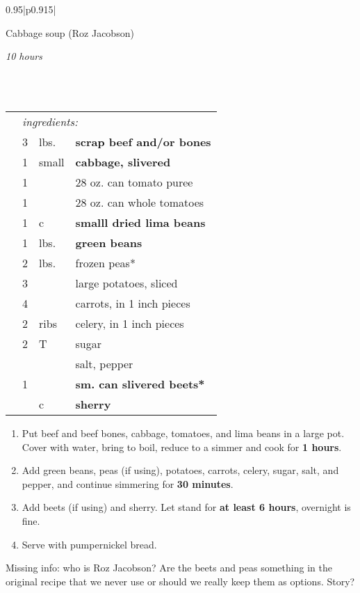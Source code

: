 \documentclass[8pt]{report}
\newcommand{\ingredmargin}{0.25cm}
\newcommand{\fr}[2]{\nicefrac{#1}{#2}}
\newenvironment{creditrecipe}[4]
  {\bigskip \bigskip 
\begin{tabular*}{0.95\textwidth}{|p{0.915\textwidth}|} \hline \vspace{0.25mm}
\begin{minipage}{0.7\textwidth}	\begin{flushleft} {\Large \textsf{#1} (#4)} \end{flushleft} \end{minipage}
\begin{minipage}{0.2\textwidth} \begin{flushright} \emph{#2} \end{flushright} \end{minipage} \\ \\ \hline
\begin{ingreds}{#3} \addcontentsline{toc}{section}{#1} \phantomsection \label{rec:#1}} 
  {\\ \hline \end{tabular*} \noindent}
\newenvironment{ingreds}[1]
  {\begin{tabular}{lrlp{0.6\textwidth}} \hspace{\ingredmargin} & \multicolumn{3}{l}{\it #1:} \\}
  {\end{tabular} \medskip}
\newcommand{\ingredsdone}{\end{ingreds}\begin{enumerate}}
\newcommand{\stepsdone}{\end{enumerate} \medskip}
\newcommand{\ingredient}[3]{\hspace{\ingredmargin} & #1 & #2 & #3 \\}
\begin{document}
\begin{creditrecipe}{Cabbage soup}{10 hours}{ingredients}{Roz Jacobson}
\index{soups!cabbage soup} \index{cabbage soup}
\ingredient{3}{lbs.}{\bf scrap beef and/or bones}
\ingredient{1}{small}{\bf cabbage, slivered}
\ingredient{1}{}{28 oz. can tomato puree}
\ingredient{1}{}{28 oz. can whole tomatoes}
\ingredient{1}{c}{\bf smalll dried lima beans}
\ingredient{1 \fr12}{lbs.}{\bf green beans}
\ingredient{2 \fr12}{lbs.}{frozen peas*}
\ingredient{3}{}{large potatoes, sliced}
\ingredient{4}{}{carrots, in 1 inch pieces}
\ingredient{2}{ribs}{celery, in 1 inch pieces}
\ingredient{2}{T}{sugar}
\ingredient{}{}{salt, pepper}
\ingredient{1}{}{\bf sm. can slivered beets*}
\ingredient{\fr23}{c}{\bf sherry}
\ingredsdone
\item Put beef and beef bones, cabbage, tomatoes, and lima beans in a large pot.  Cover with water, bring to boil, reduce to a simmer and cook for {\bf 1 \fr12 hours}.
\item Add green beans, peas (if using), potatoes, carrots, celery, sugar, salt, and pepper, and continue simmering for {\bf 30 minutes}.
\item Add beets (if using) and sherry.  Let stand for {\bf at least 6 hours}, overnight is fine.
\item Serve with pumpernickel bread.
\stepsdone
Missing info: who is Roz Jacobson?  Are the beets and peas something in the original recipe that we never use or should we really keep them as options.  Story?  
\end{creditrecipe}
\end{document}
